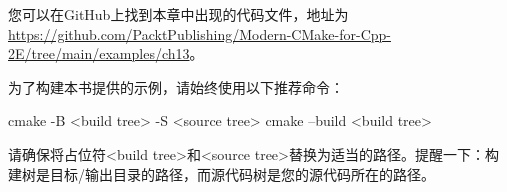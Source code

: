 您可以在GitHub上找到本章中出现的代码文件，地址为 \url{https://github.com/PacktPublishing/Modern-CMake-for-Cpp-2E/tree/main/examples/ch13}。

为了构建本书提供的示例，请始终使用以下推荐命令：

\begin{shell}
cmake -B <build tree> -S <source tree>
cmake --build <build tree>
\end{shell}

请确保将占位符<build tree>和<source tree>替换为适当的路径。提醒一下：构建树是目标/输出目录的路径，而源代码树是您的源代码所在的路径。

